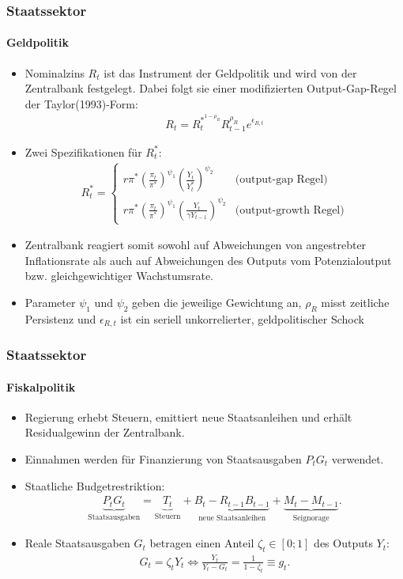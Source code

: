\documentclass[10pt]{beamer}  %
\begin{document}
\begin{frame}\frametitle{Staatssektor}\framesubtitle{Geldpolitik}
\begin{itemize}
\item Nominalzins $R_t$ ist das Instrument der Geldpolitik und wird von der Zentralbank festgelegt. Dabei folgt sie einer
modifizierten Output-Gap-Regel der Taylor(1993)-Form:
\begin{align*}
    R_t = R_t^{*^{1-\rho_R}} R_{t-1}^{\rho_R} e^{\epsilon_{R,t}}
\end{align*}
\item Zwei Spezifikationen f\"{u}r $R_t^*$:
\begin{align}\label{ASMonPol}
    R_t^* = \begin{cases}
    r\pi^* \left(\frac{\pi_t}{\pi^*}\right)^{\psi_1} \left(\frac{Y_t}{Y_t^*}\right)^{\psi_2} & \text{(output-gap Regel)}\\
    r\pi^* \left(\frac{\pi_t}{\pi^*}\right)^{\psi_1} \left(\frac{Y_t}{\gamma Y_{t-1}}\right)^{\psi_2} &\text{(output-growth Regel)}
    \end{cases}
\end{align}
\item Zentralbank reagiert somit sowohl auf Abweichungen von angestrebter Inflationsrate als auch auf Abweichungen des Outputs vom Potenzialoutput bzw. gleichgewichtiger Wachstumsrate.
\item Parameter $\psi_1$ und $\psi_2$ geben die jeweilige Gewichtung an, $\rho_R$ misst zeitliche Persistenz und $\epsilon_{R,t}$ ist ein seriell unkorrelierter, geldpolitischer Schock
\end{itemize}
\end{frame}

\begin{frame}\frametitle{Staatssektor}\framesubtitle{Fiskalpolitik}
\begin{itemize}
\item Regierung erhebt Steuern, emittiert neue Staatsanleihen und erh\"{a}lt Residualgewinn der Zentralbank.
\item Einnahmen werden f\"{u}r Finanzierung von Staatsausgaben $P_t G_t$ verwendet.
\item Staatliche Budgetrestriktion:
\begin{align*}
  \underbrace{P_t G_t}_\text{Staatsausgaben} = \underbrace{T_t}_\text{Steuern} + \underbrace{B_t - R_{t-1}B_{t-1}}_{\text{neue Staatsanleihen}}  + \underbrace{M_t - M_{t-1}}_{\text{Seignorage}}.
\end{align*}
\item Reale Staatsausgaben $G_t$ betragen einen Anteil $\zeta_t \in [0;1]$ des Outputs $Y_t$:
\begin{align}
  G_t = \zeta_t Y_t
  \Leftrightarrow \frac{Y_t}{Y_t-G_t} = \frac{1}{1-\zeta_t} \equiv g_t. \label{ASStaatsausgaben}
\end{align}
\end{itemize}
\end{frame}
\end{document}
